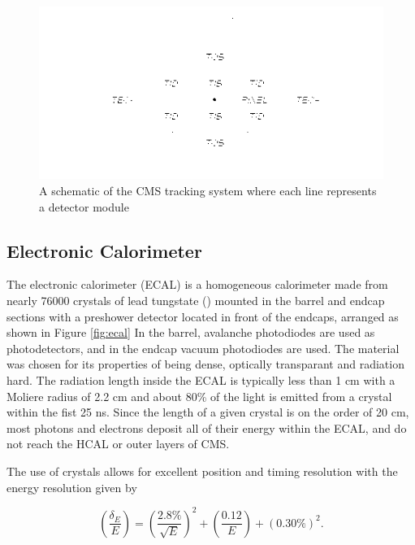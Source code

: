 \begin{figure}[htbp]
\includegraphics[width=\textwidth]{pdfs/experiment/cms_tracker.pdf}
\caption{
 A schematic of the CMS tracking system
  where each line represents a detector module
 }
\label{fig:tracker}
\end{figure}
 

 \subsection{Electronic Calorimeter}

The electronic calorimeter (ECAL) is a homogeneous
 calorimeter made from nearly 76000 crystals of lead tungstate (\pbw)
 mounted in the barrel and endcap sections with a 
 preshower detector located in front of the endcaps,
 arranged as shown in Figure \ref{fig:ecal}
In the barrel, avalanche photodiodes are used as photodetectors, 
 and in the endcap vacuum photodiodes are used. 
The material \pbw was chosen for its properties of being
 dense, optically transparant and radiation hard. 
The radiation length inside the ECAL is typically less than 1 cm
 with a Moliere radius of 2.2 cm and about 80\% of the
 light is emitted from a crystal within the fist 25 ns.
Since the length of a given crystal is on the order of 20 cm,
 most photons and electrons deposit all of their energy 
 within the ECAL, and do not reach the HCAL or outer layers 
 of CMS. 

The use of \pbw crystals allows for excellent position and timing resolution
 with the energy resolution given by 

\begin{equation}\label{eq:ecal_res}
 \left(\frac{\delta_E}{E}\right) =  \left(\frac{2.8\%}{\sqrt{E}}\right)^2 + \left(\frac{0.12}{E}\right) + (0.30\%)^2 .
\end{equation}
 
